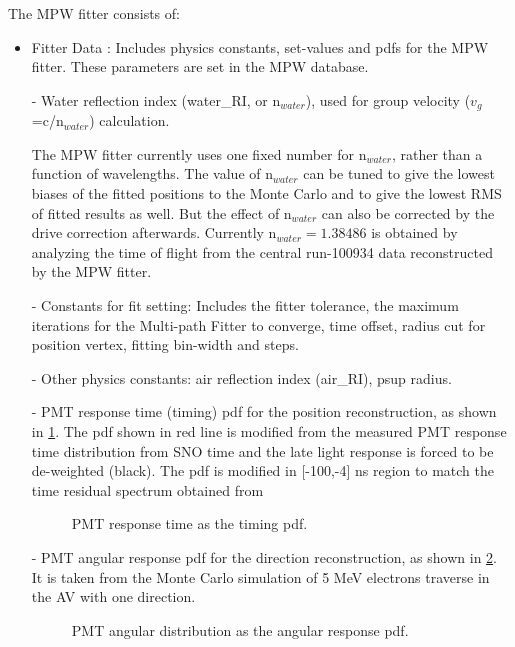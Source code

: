The MPW fitter consists of: 
\begin{itemize}
	\item Fitter Data : Includes physics constants, set-values and pdfs for the MPW fitter. These parameters are set in the MPW database.
	
	- Water reflection index (water\_RI, or n$_{water}$), used for group velocity ($v_g$ =c/n$_{water}$) calculation. 
	
	The MPW fitter currently uses one fixed number for n$_{water}$, rather than a function of wavelengths. The value of n$_{water}$ can be tuned to give the lowest biases of the fitted positions to the Monte Carlo and to give the lowest RMS of fitted results as well. But the effect of n$_{water}$ can also be corrected by the drive correction afterwards. Currently n$_{water}=1.38486$ is obtained by analyzing the time of flight from the  central run-100934 data reconstructed by the MPW fitter. 
	
	- Constants for fit setting: Includes the fitter tolerance, the maximum iterations for the Multi-path Fitter to converge, time offset, radius cut for position vertex, fitting bin-width and steps.
	
	- Other physics constants: air reflection index (air\_RI), psup radius.
	
	- PMT response time (timing) pdf for the position reconstruction, as shown in \ref{MPW_timingPDF}. The pdf shown in red line is modified from the measured PMT response time distribution from SNO time and the late light response is forced to be de-weighted (black). The pdf is modified in [-100,-4] ns region to match the time residual spectrum obtained from %
	
	\begin{figure}[!htb]
		\centering
		\caption{PMT response time as the timing pdf.}
		\label{MPW_timingPDF}
	\end{figure}
	
	- PMT angular response pdf for the direction reconstruction, as shown in \ref{MPW_angularPDF}. It is taken from the Monte Carlo simulation of 5 MeV electrons traverse in the AV with one direction.
	
	\begin{figure}[!htb]
		\centering
		\caption{PMT angular distribution as the angular response pdf.}
		\label{MPW_angularPDF}
	\end{figure}
	

\end{itemize}
